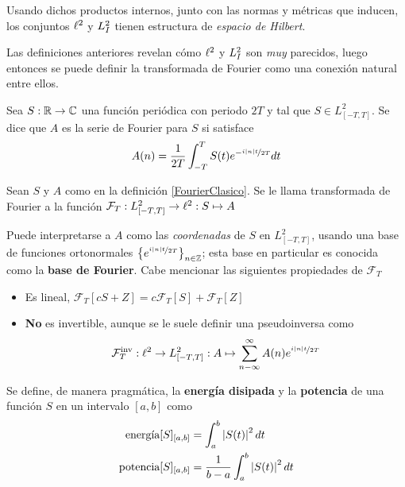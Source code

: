 Usando dichos productos internos, junto con las normas y métricas que inducen, los conjuntos 
$\ell^{2}$ y $L^{2}_I$ tienen estructura de \textit{espacio de Hilbert}.

Las definiciones anteriores revelan cómo $\ell^{2}$ y $L^{2}_I$ son \textit{muy} parecidos, luego
entonces se puede definir la transformada de Fourier como una conexión natural entre ellos.

\begin{definicion}
Sea $S: \mathbb{R} \rightarrow \mathbb{C}$ una función periódica con periodo $2T$ y tal que 
$S \in L^{2}_{[-T,T]}$. Se dice que $A$ es la serie de Fourier para $S$ si satisface
\begin{equation*}
A(n) = \frac{1}{2 T} \int_{- T }^{ T } S(t) e^{-\nicefrac{ i \left| n \right| t}{2T}} dt
\end{equation*}
\label{FourierClasico}
\end{definicion}

\begin{definicion}
Sean $S$ y $A$ como en la definición \ref{FourierClasico}. Se le llama transformada de Fourier a la
función $\mathcal{F}_T : L^{2}_{[-T,T]} \rightarrow \ell^{2} : S \mapsto A$
\end{definicion}

Puede interpretarse a $A$ como las \textit{coordenadas} de $S$ en $L^{2}_{[-T,T]}$, usando una base 
de funciones ortonormales $\left\{ e^{\nicefrac{i \left| n \right| t}{2 T}} \right\}_{n\in \mathbb{Z}}$; esta base 
en particular es conocida como la \textbf{base de Fourier}.
%
Cabe mencionar las siguientes propiedades de $\mathcal{F}_T$
\begin{itemize}
\item Es lineal, $\mathcal{F}_T[cS + Z] = c\mathcal{F}_T[S] + \mathcal{F}_T[Z]$

\item \textbf{No} es invertible, aunque se le suele definir una pseudoinversa como
\begin{equation*}
\mathcal{F}_{T}^{\text{inv}} : \ell^{2} \rightarrow L^{2}_{[-T,T]} :
A \mapsto \sum_{n -\infty}^{\infty} A(n) e^{\nicefrac{i \left| n \right| t}{2 T}}
\end{equation*}
\end{itemize}

Se define, de manera pragmática, la \textbf{energía disipada} y la \textbf{potencia} de una función 
$S$ en un intervalo $[a,b]$ como 
\begin{align}
\text{energía}[S]_{[a,b]} &= \int_a^{b} \left| S(t) \right|^{2} dt \nonumber \\
\text{potencia}[S]_{[a,b]} &= \frac{1}{b-a} \int_a^{b} \left| S(t) \right|^{2} dt
\label{energia}
\end{align}

